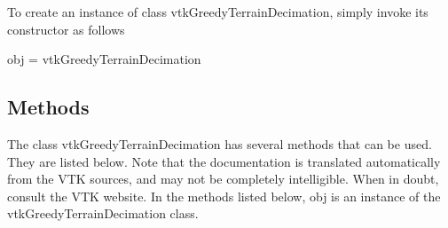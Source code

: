 To create an instance of class vtk\-Greedy\-Terrain\-Decimation, simply invoke its constructor as follows \begin{DoxyVerb}  obj = vtkGreedyTerrainDecimation
\end{DoxyVerb}
 \hypertarget{vtkwidgets_vtkxyplotwidget_Methods}{}\subsection{Methods}\label{vtkwidgets_vtkxyplotwidget_Methods}
The class vtk\-Greedy\-Terrain\-Decimation has several methods that can be used. They are listed below. Note that the documentation is translated automatically from the V\-T\-K sources, and may not be completely intelligible. When in doubt, consult the V\-T\-K website. In the methods listed below, {\ttfamily obj} is an instance of the vtk\-Greedy\-Terrain\-Decimation class. 
